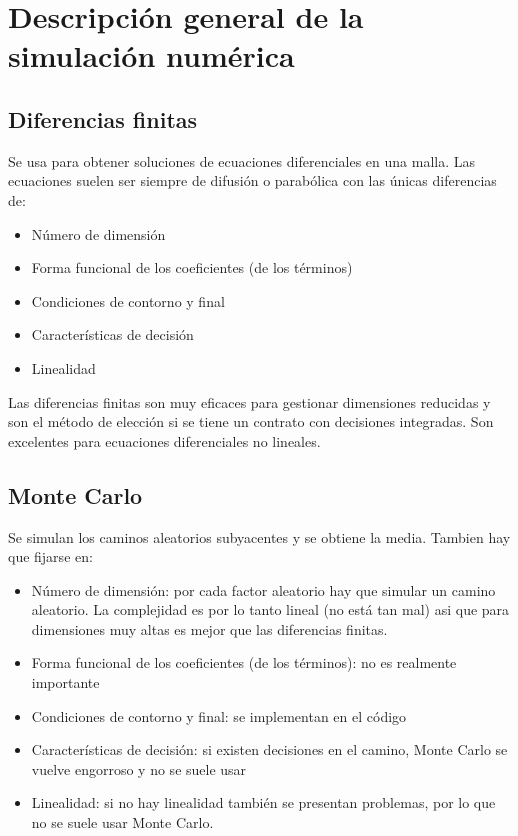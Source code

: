 \chapter{Descripción general de la simulación numérica}

\section{Diferencias finitas}
Se usa para obtener soluciones de ecuaciones diferenciales en una malla. Las ecuaciones suelen ser siempre de difusión o parabólica con las únicas diferencias de:
\begin{itemize}
    \item Número de dimensión
    \item Forma funcional de los coeficientes (de los términos)
    \item Condiciones de contorno y final
    \item Características de decisión
    \item Linealidad
\end{itemize}

Las diferencias finitas son muy eficaces para gestionar dimensiones reducidas y son el método de elección si se tiene un contrato con decisiones integradas. Son excelentes para ecuaciones diferenciales no lineales.



\section{Monte Carlo}
Se simulan los caminos aleatorios subyacentes y se obtiene la media. Tambien hay que fijarse en:
\begin{itemize}
    \item Número de dimensión: por cada factor aleatorio hay que simular un camino aleatorio. La complejidad es por lo tanto lineal (no está tan mal) asi que para dimensiones muy altas es mejor que las diferencias finitas.
    \item Forma funcional de los coeficientes (de los términos): no es realmente importante
    \item Condiciones de contorno y final: se implementan en el código
    \item Características de decisión: si existen decisiones en el camino, Monte Carlo se vuelve engorroso y no se suele usar
    \item Linealidad: si no hay linealidad también se presentan problemas, por lo que no se suele usar Monte Carlo.
\end{itemize}







